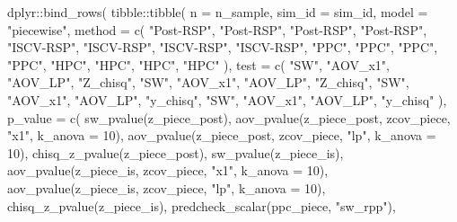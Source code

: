 \documentclass[
  english,
  letterpaper,
  DIV=11,
  numbers=noendperiod]{scrartcl}
\newenvironment{Shaded}{\begin{snugshade}}{\end{snugshade}}
\newcommand{\AttributeTok}[1]{\textcolor[rgb]{0.40,0.45,0.13}{#1}}
\newcommand{\DecValTok}[1]{\textcolor[rgb]{0.68,0.00,0.00}{#1}}
\newcommand{\FunctionTok}[1]{\textcolor[rgb]{0.28,0.35,0.67}{#1}}
\newcommand{\NormalTok}[1]{\textcolor[rgb]{0.00,0.23,0.31}{#1}}
\newcommand{\SpecialCharTok}[1]{\textcolor[rgb]{0.37,0.37,0.37}{#1}}
\newcommand{\StringTok}[1]{\textcolor[rgb]{0.13,0.47,0.30}{#1}}
\begin{document}
\begin{Shaded}
\begin{Highlighting}[]
\NormalTok{  dplyr}\SpecialCharTok{::}\FunctionTok{bind\_rows}\NormalTok{(}
\NormalTok{    tibble}\SpecialCharTok{::}\FunctionTok{tibble}\NormalTok{(}
      \AttributeTok{n =}\NormalTok{ n\_sample,}
      \AttributeTok{sim\_id =}\NormalTok{ sim\_id,}
      \AttributeTok{model =} \StringTok{"piecewise"}\NormalTok{,}
      \AttributeTok{method =} \FunctionTok{c}\NormalTok{(}
        \StringTok{"Post{-}RSP"}\NormalTok{, }\StringTok{"Post{-}RSP"}\NormalTok{, }\StringTok{"Post{-}RSP"}\NormalTok{, }\StringTok{"Post{-}RSP"}\NormalTok{,}
        \StringTok{"ISCV{-}RSP"}\NormalTok{, }\StringTok{"ISCV{-}RSP"}\NormalTok{, }\StringTok{"ISCV{-}RSP"}\NormalTok{, }\StringTok{"ISCV{-}RSP"}\NormalTok{,}
        \StringTok{"PPC"}\NormalTok{, }\StringTok{"PPC"}\NormalTok{, }\StringTok{"PPC"}\NormalTok{, }\StringTok{"PPC"}\NormalTok{,}
        \StringTok{"HPC"}\NormalTok{, }\StringTok{"HPC"}\NormalTok{, }\StringTok{"HPC"}\NormalTok{, }\StringTok{"HPC"}
\NormalTok{      ),}
      \AttributeTok{test =} \FunctionTok{c}\NormalTok{(}
        \StringTok{"SW"}\NormalTok{, }\StringTok{"AOV\_x1"}\NormalTok{, }\StringTok{"AOV\_LP"}\NormalTok{, }\StringTok{"Z\_chisq"}\NormalTok{,}
        \StringTok{"SW"}\NormalTok{, }\StringTok{"AOV\_x1"}\NormalTok{, }\StringTok{"AOV\_LP"}\NormalTok{, }\StringTok{"Z\_chisq"}\NormalTok{,}
        \StringTok{"SW"}\NormalTok{, }\StringTok{"AOV\_x1"}\NormalTok{, }\StringTok{"AOV\_LP"}\NormalTok{, }\StringTok{"y\_chisq"}\NormalTok{,}
        \StringTok{"SW"}\NormalTok{, }\StringTok{"AOV\_x1"}\NormalTok{, }\StringTok{"AOV\_LP"}\NormalTok{, }\StringTok{"y\_chisq"}
\NormalTok{      ),}
      \AttributeTok{p\_value =} \FunctionTok{c}\NormalTok{(}
        \FunctionTok{sw\_pvalue}\NormalTok{(z\_piece\_post),}
        \FunctionTok{aov\_pvalue}\NormalTok{(z\_piece\_post, zcov\_piece, }\StringTok{"x1"}\NormalTok{, }\AttributeTok{k\_anova =} \DecValTok{10}\NormalTok{),}
        \FunctionTok{aov\_pvalue}\NormalTok{(z\_piece\_post, zcov\_piece, }\StringTok{"lp"}\NormalTok{, }\AttributeTok{k\_anova =} \DecValTok{10}\NormalTok{),}
        \FunctionTok{chisq\_z\_pvalue}\NormalTok{(z\_piece\_post),}
        \FunctionTok{sw\_pvalue}\NormalTok{(z\_piece\_is),}
        \FunctionTok{aov\_pvalue}\NormalTok{(z\_piece\_is, zcov\_piece, }\StringTok{"x1"}\NormalTok{, }\AttributeTok{k\_anova =} \DecValTok{10}\NormalTok{),}
        \FunctionTok{aov\_pvalue}\NormalTok{(z\_piece\_is, zcov\_piece, }\StringTok{"lp"}\NormalTok{, }\AttributeTok{k\_anova =} \DecValTok{10}\NormalTok{),}
        \FunctionTok{chisq\_z\_pvalue}\NormalTok{(z\_piece\_is),}
        \FunctionTok{predcheck\_scalar}\NormalTok{(ppc\_piece, }\StringTok{"sw\_rpp"}\NormalTok{),}

\end{Highlighting}
\end{Shaded}
\end{document}
